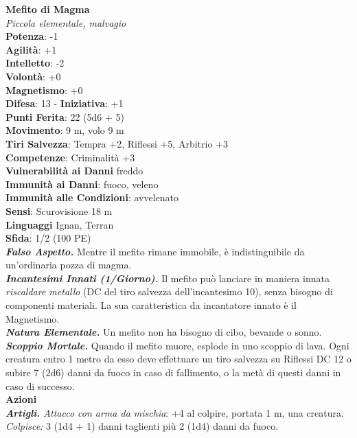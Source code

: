 \begin{multicols}{2}
\medskip\textbf{Mefito di Magma}\\
\emph{Piccola elementale, malvagio}\\
\textbf{Potenza}: -1\\
\textbf{Agilità}: +1\\
\textbf{Intelletto}: -2\\
\textbf{Volontà}: +0\\
\textbf{Magnetismo}: +0\\
\textbf{Difesa}: 13 - \textbf{Iniziativa}: +1\\
\textbf{Punti Ferita}: 22 (5d6 + 5)\\
\textbf{Movimento}: 9 m, volo 9 m\\
\textbf{Tiri Salvezza}: Tempra +2, Riflessi +5, Arbitrio +3\\
\textbf{Competenze}: Criminalità +3\\
\textbf{Vulnerabilità ai Danni} freddo\\
\textbf{Immunità ai Danni}: fuoco, veleno\\
\textbf{Immunità alle Condizioni}: avvelenato\\
\textbf{Sensi}: Scurovisione 18 m\\
\textbf{Linguaggi} Ignan, Terran\\
\textbf{Sfida}: 1/2 (100 PE)\smallskip\\
\emph{\textbf{Falso Aspetto.}} Mentre il mefito rimane immobile, è indistinguibile da un'ordinaria pozza di magma.\\
\emph{\textbf{Incantesimi Innati (1/Giorno).}} Il mefito può lanciare in maniera innata \emph{riscaldare metallo} (DC del tiro salvezza dell'incantesimo 10), senza bisogno di componenti materiali. La sua caratteristica da incantatore innato è il Magnetismo.\\
\emph{\textbf{Natura Elementale.}} Un mefito non ha bisogno di cibo, bevande o sonno.\\
\emph{\textbf{Scoppio Mortale.}} Quando il mefito muore, esplode in uno scoppio di lava. Ogni creatura entro 1 metro da esso deve effettuare un tiro salvezza su Riflessi DC  12 o subire 7 (2d6) danni da fuoco in caso di fallimento, o la metà di questi danni in caso di successo.\\
\smallskip\textbf{Azioni}\\
\emph{\textbf{Artigli.} Attacco con arma da mischia}: +4 al colpire, portata 1 m, una creatura.\\
\emph{Colpisce:} 3 (1d4 + 1) danni taglienti più 2 (1d4) danni da fuoco.\\

\end{multicols}
